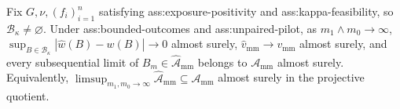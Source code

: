 Fix \(G,\nu,(f_i)_{i=1}^n\) satisfying ass:exposure-positivity and ass:kappa-feasibility, so \(\mathcal B_\kappa\neq\varnothing\).  Under ass:bounded-outcomes and ass:unpaired-pilot, as \(m_1\wedge m_0\to\infty\), \(\sup_{B\in\mathcal B_\kappa}|\widehat w(B)-w(B)|\to0\) almost surely, \(\widehat v_{\mathrm{mm}}\to v_{\mathrm{mm}}\) almost surely, and every subsequential limit of \(B_m\in\widehat{\mathcal A}_{\mathrm{mm}}\) belongs to \(\mathcal A_{\mathrm{mm}}\) almost surely.  Equivalently, \(\limsup_{m_1,m_0\to\infty}\widehat{\mathcal A}_{\mathrm{mm}}\subseteq\mathcal A_{\mathrm{mm}}\) almost surely in the projective quotient.